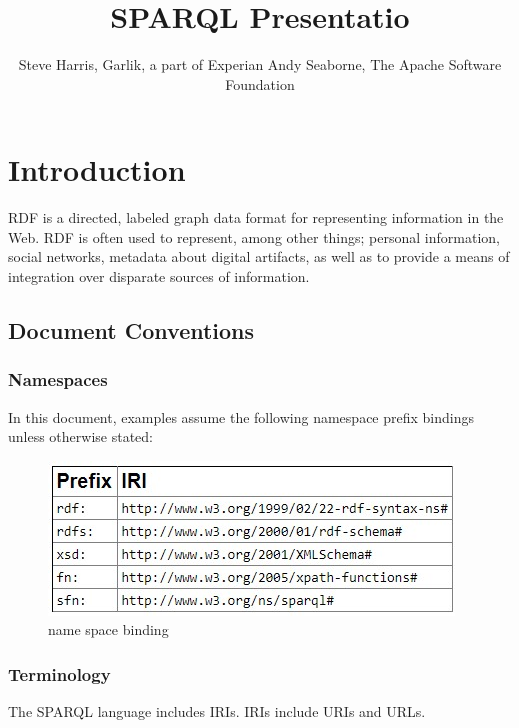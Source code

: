 \documentclass[output=paper,
colorlinks,
citecolor=brown,
newtxmath
]{langscibook}
\author{Steve Harris, Garlik, a part of Experian
Andy Seaborne, The Apache Software Foundation\affiliation{W3C}}
\title{SPARQL Presentatio}
\begin{document}
\maketitle


\section{Introduction} 
RDF is a directed, labeled graph data format for representing information in the Web. RDF is often used to represent, among other things; personal information, social networks, metadata about digital artifacts, as well as to provide a means of integration over disparate sources of information.
\subsection{Document Conventions}
\subsubsection{Namespaces}
In this document, examples assume the following namespace prefix bindings unless otherwise stated:

\begin{figure}[htp]\centering
\caption{name space binding}
\includegraphics{langsci/img/namespacePrefixBindings.jpg}
\end{figure}

\subsubsection{Terminology}
The SPARQL language includes IRIs. IRIs include URIs and URLs.








\end{document}
